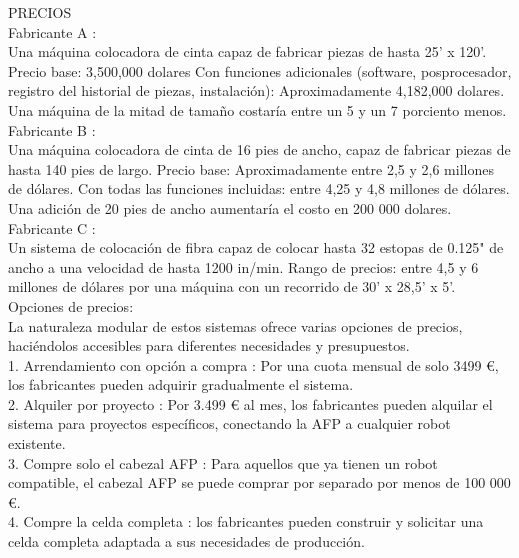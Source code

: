 PRECIOS\\
Fabricante A :\\
Una máquina colocadora de cinta capaz de fabricar piezas de hasta 25' x 120'.
Precio base: 3,500,000 dolares
Con funciones adicionales (software, posprocesador, registro del historial de piezas, instalación): Aproximadamente 4,182,000 dolares.
\\Una máquina de la mitad de tamaño costaría entre un 5 y un 7 porciento menos.
\\Fabricante B :\\
Una máquina colocadora de cinta de 16 pies de ancho, capaz de fabricar piezas de hasta 140 pies de largo.
Precio base: Aproximadamente entre 2,5 y 2,6 millones de dólares.
Con todas las funciones incluidas: entre 4,25 y 4,8 millones de dólares.
Una adición de 20 pies de ancho aumentaría el costo en 200 000 dolares.\\
Fabricante C :\\
Un sistema de colocación de fibra capaz de colocar hasta 32 estopas de 0.125" de ancho a una velocidad de hasta 1200 in/min.
Rango de precios: entre 4,5 y 6 millones de dólares por una máquina con un recorrido de 30' x 28,5' x 5'.\\
Opciones de precios:\\
La naturaleza modular de estos sistemas ofrece varias opciones de precios, haciéndolos accesibles para diferentes necesidades y presupuestos.\\
1.	Arrendamiento con opción a compra : Por una cuota mensual de solo 3499 €, los fabricantes pueden adquirir gradualmente el sistema.\\
2.	Alquiler por proyecto : Por 3.499 € al mes, los fabricantes pueden alquilar el sistema para proyectos específicos, conectando la AFP a cualquier robot existente.\\
3.	Compre solo el cabezal AFP : Para aquellos que ya tienen un robot compatible, el cabezal AFP se puede comprar por separado por menos de 100 000 €.\\
4.	Compre la celda completa : los fabricantes pueden construir y solicitar una celda completa adaptada a sus necesidades de producción.